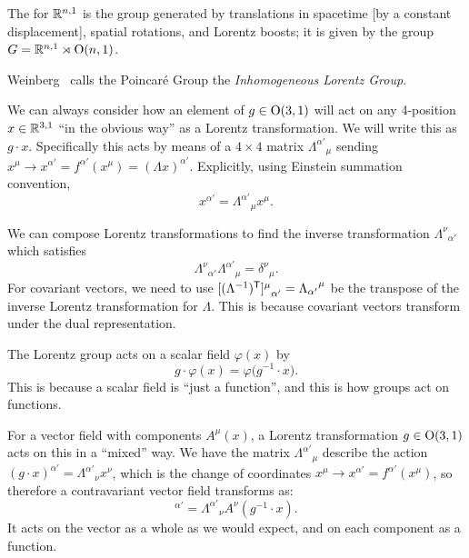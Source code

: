\begin{definition}\label{defn:relativity:poincare-group}
The  for $\mathbb{R}^{n,1}$ is the group generated by
translations in spacetime [by a constant displacement], spatial
rotations, and Lorentz boosts; it is given by the group
$G = \mathbb{R}^{n,1}\rtimes\mathrm{O}(n,1)$.
\end{definition}

\begin{remark}
Weinberg~\cite{Weinberg:1995mt} calls the Poincar\'e Group the \emph{Inhomogeneous Lorentz Group}.
\end{remark}

\M
We can always consider how an element of $g\in\mathrm{O}(3,1)$ will act on any
4-position $x\in\mathbb{R}^{3,1}$ ``in the obvious way'' as a Lorentz
transformation. We will write this as $g\cdot x$. Specifically this acts
by means of a $4\times4$ matrix ${\Lambda^{\alpha'}}_{\mu}$ sending
$x^{\mu}\to x^{\alpha'} = f^{\alpha'}(x^{\mu}) = (\Lambda x)^{\alpha'}$.
Explicitly, using Einstein summation convention,
\begin{equation*}
x^{\alpha'} = {\Lambda^{\alpha'}}_{\mu}x^{\mu}.
\end{equation*}

We can compose Lorentz transformations to find the inverse
transformation ${\Lambda^{\nu}}_{\alpha'}$ which satisfies
\begin{equation}
{\Lambda^{\nu}}_{\alpha'}{\Lambda^{\alpha'}}_{\mu}={\delta^{\nu}}_{\mu}.
\end{equation}
For covariant vectors, we need to use
${[(\Lambda^{-1})^{\mathsf{T}}]^{\mu}}_{\alpha'} = {\Lambda_{\alpha'}}^{\mu}$
be the transpose of the inverse Lorentz transformation for $\Lambda$.
This is because covariant vectors transform under the dual
representation. 


\M
The Lorentz group acts on a scalar field $\varphi(x)$ by
\begin{equation}
g\cdot\varphi(x) = \varphi\bigl(g^{-1}\cdot x\bigr).
\end{equation}
This is because a scalar field is ``just a function'', and this is how
groups act on functions.

For a vector field with components $A^{\mu}(x)$, a Lorentz
transformation $g\in\mathrm{O}(3,1)$ acts on this in a ``mixed'' way. We have
the matrix ${\Lambda^{\alpha'}}_{\mu}$ describe the action $(g\cdot x)^{\alpha'} = {\Lambda^{\alpha'}}_{\nu}x^{\nu}$,
which is the change of coordinates $x^{\mu}\to x^{\alpha'}=f^{\alpha'}(x^{\mu})$,
so therefore a contravariant vector field transforms as:
\begin{equation}
[(g\cdot \vec{A})(x)]^{\alpha'} = {\Lambda^{\alpha'}}_{\nu}A^{\nu}(g^{-1}\cdot x).
\end{equation}
It acts on the vector as a whole as we would expect, and on each
component as a function.

